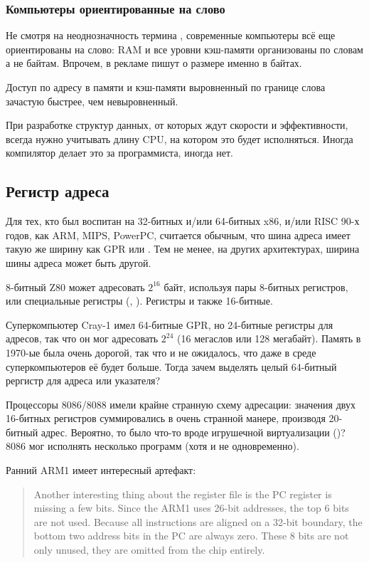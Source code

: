 \subsubsection{Компьютеры ориентированные на слово}

Не смотря на неоднозначность термина , современные компьютеры всё еще ориентированы на слово:
\ac{RAM} и все уровни кэш-памяти организованы по словам а не байтам.
Впрочем, в рекламе пишут о размере именно в байтах.

Доступ по адресу в памяти и кэш-памяти выровненный по границе слова зачастую быстрее, чем невыровненный.

При разработке структур данных, от которых ждут скорости и эффективности, всегда нужно учитывать длину 
CPU, на котором это будет исполняться.
Иногда компилятор делает это за программиста, иногда нет.

\subsection{Регистр адреса}

Для тех, кто был воспитан на 32-битных и/или 64-битных x86, и/или RISC 90-х годов, как ARM, MIPS, PowerPC, считается
обычным, что шина адреса имеет такую же ширину как \ac{GPR} или .
Тем не менее, на других архитектурах, ширина шины адреса может быть другой.

8-битный Z80 может адресовать $2^{16}$ байт, используя пары 8-битных регистров, или специальные регистры (, ).
Регистры  и  также 16-битные.

Суперкомпьютер Cray-1 имел 64-битные GPR, но 24-битные регистры для адресов, так что он мог адресовать
$2^{24}$ (16 мегаслов или 128 мегабайт).
Память в 1970-ые была очень дорогой, так что и не ожидалось, что даже в среде суперкомпьютеров её будет больше.
Тогда зачем выделять целый 64-битный рергистр для адреса или указателя?

Процессоры 8086/8088 имели крайне странную схему адресации:
значения двух 16-битных регистров суммировались в очень странной манере, производя 20-битный адрес.
Вероятно, то было что-то вроде игрушечной виртуализации ()?
8086 мог исполнять несколько программ (хотя и не одновременно).

Ранний ARM1 имеет интересный артефакт:

\begin{framed}
\begin{quotation}
Another interesting thing about the register file is the PC register is missing a few bits. Since the ARM1 uses 26-bit addresses, the top 6 bits are not used. Because all instructions are aligned on a 32-bit boundary, the bottom two address bits in the PC are always zero. These 8 bits are not only unused, they are omitted from the chip entirely.
\end{quotation}
\end{framed}

